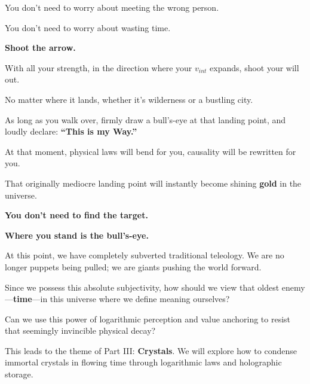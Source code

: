 You don't need to worry about meeting the wrong person.

You don't need to worry about wasting time.

\textbf{Shoot the arrow.}

With all your strength, in the direction where your $v_{int}$ expands, shoot your will out.

No matter where it lands, whether it's wilderness or a bustling city.

As long as you walk over, firmly draw a bull's-eye at that landing point, and loudly declare: \textbf{``This is my Way.''}

At that moment, physical laws will bend for you, causality will be rewritten for you.

That originally mediocre landing point will instantly become shining \textbf{gold} in the universe.

\textbf{You don't need to find the target.}

\textbf{Where you stand is the bull's-eye.}

At this point, we have completely subverted traditional teleology. We are no longer puppets being pulled; we are giants pushing the world forward.

Since we possess this absolute subjectivity, how should we view that oldest enemy---\textbf{time}---in this universe where we define meaning ourselves?

Can we use this power of logarithmic perception and value anchoring to resist that seemingly invincible physical decay?

This leads to the theme of Part III: \textbf{Crystals}. We will explore how to condense immortal crystals in flowing time through logarithmic laws and holographic storage.

